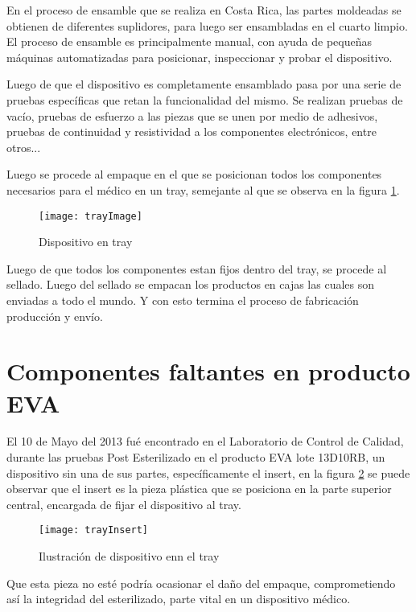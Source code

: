 En el proceso de ensamble que se realiza en Costa Rica, las partes moldeadas se obtienen
de diferentes suplidores, para luego ser ensambladas en el cuarto limpio. El proceso de
ensamble es principalmente manual, con ayuda de peque\~nas m\'aquinas automatizadas para
posicionar, inspeccionar y probar el dispositivo. \par

Luego de que el dispositivo es completamente ensamblado pasa por una serie de pruebas
espec\'ificas que retan la funcionalidad del mismo. Se realizan pruebas de vac\'io, pruebas de esfuerzo a las piezas que se unen por medio de adhesivos, pruebas de continuidad
y resistividad a los componentes electr\'onicos, entre otros... \par


Luego se procede al empaque en el que se posicionan todos los componentes necesarios
para el m\'edico en un tray, semejante al que se observa en la figura \ref{fig:tray}.

\begin{figure}[H]
\centering
\texttt{[image: trayImage]}
\caption{Dispositivo en tray}
\label{fig:tray}
\end{figure}

Luego de que todos los componentes estan fijos dentro del tray, se procede al sellado. Luego del sellado se empacan los productos en cajas las cuales son enviadas a todo el mundo. Y con esto termina el proceso de fabricaci\'on producci\'on y env\'io.

\newpage
\section{Componentes faltantes en producto EVA}

El 10 de Mayo del 2013 fu\'e encontrado en el Laboratorio  de Control de Calidad, durante las pruebas Post Esterilizado en el producto EVA lote 13D10RB, un dispositivo sin una de sus partes, espec\'ificamente el insert, en la figura \ref{fig:insert} se puede observar que el insert es la pieza pl\'astica que se posiciona en la parte superior central, encargada de fijar el dispositivo al tray.

\begin{figure}[H]
\centering
\texttt{[image: trayInsert]}
\caption{Ilustraci\'on de dispositivo enn el tray}
\label{fig:insert}
\end{figure}

Que esta pieza no est\'e podr\'ia ocasionar el da\~no del empaque, comprometiendo as\'i la integridad del esterilizado, parte vital en un dispositivo m\'edico.

